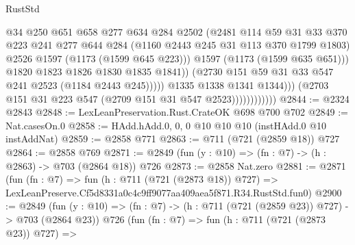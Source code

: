 \begin{lexlean}{RustStd}
\begin{coremodule}
                                          @34
                                          @250
                                          @651
                                          @658
                                          @277
                                          @634
                                          @284
                                          @2502
                                          (@2481
                                            @114
                                            @59
                                            @31
                                            @33
                                            @370
                                            @223
                                            @241
                                            @277
                                            @644
                                            @284
                                            (@1160 @2443 @245 @31 @113 @370 @1799 @1803)
                                            @2526
                                            @1597
                                            (@1173 (@1599 @645 @223)))
                                          @1597
                                          (@1173 (@1599 @635 @651)))
                                        @1820
                                        @1823
                                        @1826
                                        @1830
                                        @1835
                                        @1841))
                                    (@2730 @151 @59 @31 @33 @547 @241 @2523 (@1184 @2443 @245)))))
                              @1335
                              @1338
                              @1341
                              @1344)))
                        (@2703 @151 @31 @223 @547 (@2709 @151 @31 @547 @2523))))))))))))
@2844 := @2324 @2843
@2848 := LexLeanPreservation.Rust.CrateOK @698 @700 @702
@2849 := Nat.casesOn.{0}
@2858 := HAdd.hAdd.{0, 0, 0} @10 @10 @10 (instHAdd.{0} @10 instAddNat)
@2859 := @2858 @771
@2863 := @711 (@721 (@2859 @18)) @727
@2864 := @2858 @769
@2871 := @2849 (fun (y : @10) => (fn : @7) -> (h : @2863) -> @703 (@2864 @18)) @726
@2873 := @2858 Nat.zero
@2881 := @2871
    (fun (fn : @7) =>
    fun (h : @711 (@721 (@2873 @18)) @727) =>
    LexLeanPreserve.Cf5d8331a0c4c9ff9077aa409aea5f871.R34.RustStd.fun0)
@2900 := @2849
    (fun (y : @10) => (fn : @7) -> (h : @711 (@721 (@2859 @23)) @727) -> @703 (@2864 @23))
    @726
    (fun (fn : @7) =>
    fun (h : @711 (@721 (@2873 @23)) @727) =>

\end{coremodule}
\end{lexlean}
